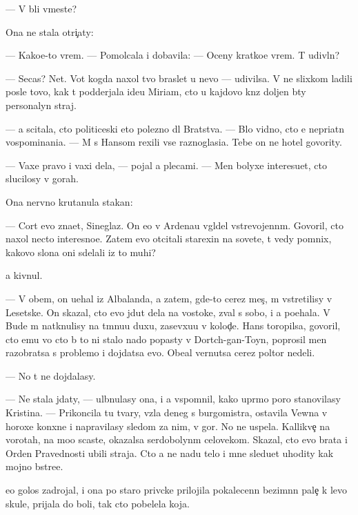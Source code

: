 \documentclass[10pt]{book}
\begin{document}
— V{\yi} b{\yi}li vmeste?

Ona ne stala otri{\c}aty:

— Kako{\y}e-to vrem{\ia}. — Pomolcala i dobavila: — Oceny kratko{\y}e vrem{\ia}. T{\yi} udivl{\e}n?

— Se{\y}cas? Net. Vot kogda naxol tvo{\y} braslet u nevo — udivilsa. V{\yi} ne slixkom ladili posle tovo, kak t{\yi} podderjala ide{\y}u Mi\-ri\-am, cto u kajdovo kn{\ia}z{\ia} doljen b{\yi}ty personalyn{\yi}{\y} straj.

— {\Y}a scitala, cto politiceski eto polezno dl{\ia} Bratstva. — B{\yi}lo vidno, cto {\y}e{\y} nepri{\y}atn{\yi} vospominani{\y}a. — M{\yi} s Hansom rexili vse raznoglasi{\y}a. Tebe on ne hotel govority.

— Vaxe pravo i vaxi dela, — pojal {\y}a plecami. — Men{\ia} bolyxe interesu{\y}et, cto slucilosy v gorah.

Ona nervno krutanula stakan:

— Cort {\y}evo zna{\y}et, Sineglaz{\yi}{\y}. On {\y}e{\x}o v Ardenau v{\yi}gl{\ia}del vstrevojenn{\yi}m. Govoril, cto naxol necto interesno{\y}e. Zatem {\y}evo otcitali stare{\y}xin{\yi} na sovete, t{\yi} vedy pomnix, kakovo slona oni sdelali iz to{\y} muhi?

{\Y}a kivnul.

— V ob{\x}em, on u{\y}ehal iz Albalanda, a zatem, gde-to cerez mes{\ia}{\c}, m{\yi} vstretilisy v Lesetske. On skazal, cto {\y}evo jdut dela na vostoke, zval s sobo{\y}, i {\y}a po{\y}ehala. V Bude m{\yi} natknulisy na t{\e}mnu{\y}u duxu, zasevxu{\y}u v kolod{\c}e. Hans toropilsa, govoril, cto {\y}emu vo cto b{\yi} to ni stalo nado popasty v Dortch-gan-Toyn, poprosil men{\ia} razobratsa s problemo{\y} i dojdatsa {\y}evo. Obe{\x}al vernutsa cerez poltor{\yi} nedeli.

— No t{\yi} ne dojdalasy.

— Ne stala jdaty, — ul{\yi}bnulasy ona, i {\y}a vspomnil, kako{\y} upr{\ia}mo{\y} poro{\y} stanovilasy Kristina. — Prikoncila tu tvary, vz{\ia}la deneg s burgomistra, ostavila Vewna v horoxe{\y} kon{\io}xne i napravilasy sledom za nim, v gor{\yi}. No ne uspela. Kallikve{\c} na vorotah, na mo{\y}o scast{\y}e, okazalsa serdobolyn{\yi}m celovekom. Skazal, cto {\y}evo brat{\y}a i Orden Pravednosti ubili straja. Cto {\y}a ne na{\y}du telo i mne sledu{\y}et uhodity kak mojno b{\yi}stre{\y}e.

{\Y}e{\y}o golos zadrojal, i ona po staro{\y} priv{\yi}cke prilojila pokalecenn{\yi}{\y} bez\-im{\ia}n\-n{\yi}{\y} pale{\c} k levo{\y} skule, prijala do boli, tak cto pobelela koja.
\end{document}
